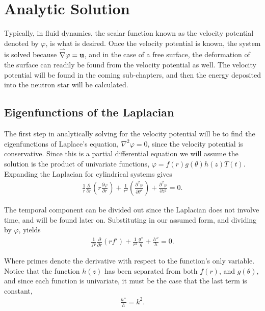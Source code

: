 \documentclass[12pt]{article}
\begin{document}
\doublespacing
\linespread{2}

\section{Analytic Solution}

Typically, in fluid dynamics, the scalar function known as the velocity potential denoted by $\varphi$, is what is desired. Once the velocity potential is known, the system is solved because  $\overset{\rightharpoonup}\nabla \varphi = \bf{u}$, and in the case of a free surface, the deformation of the surface can readily be found from the velocity potential as well. The velocity potential will be found in the coming sub-chapters, and then the energy deposited into the neutron star will be calculated.

\subsection{Eigenfunctions of the Laplacian}

The first step in analytically solving for the velocity potential will be to find the eigenfunctions of Laplace's equation, $\nabla^2 \varphi = 0$, since the velocity potential is conservative. Since this is a partial differential equation we will assume the solution is the product of univariate functions, $\varphi = f(r) g(\theta) h(z) T(t)$. Expanding the Laplacian for cylindrical systems gives 
\begin{align*}
\frac{1}{r}\frac{\partial}{\partial r} \left( r \frac{\partial \varphi}{\partial r} \right) + \frac{1}{r^2} \left( \frac{\partial^2 \varphi}{\partial \theta^2} \right) + \frac{\partial^2 \varphi}{\partial z^2} = 0.
\end{align*}

The temporal component can be divided out since the Laplacian does not involve time, and will be found later on. Substituting in our assumed form, and dividing by $\varphi$, yields
\begin{align}
\label{eq:laplaciansub}
\frac{1}{fr}\frac{\partial}{\partial r}(rf') + \frac{1}{r^2}\frac{g''}{g} + \frac{h''}{h} = 0.
\end{align}

Where primes denote the derivative with respect to the function's only variable. Notice that the function $h(z)$ has been separated from both $f(r)$, and $g(\theta)$, and since each function is univariate, it must be the case that the last term is constant,
\begin{align*}
\frac{h''}{h} = k^2.
\end{align*}
\end{document}
